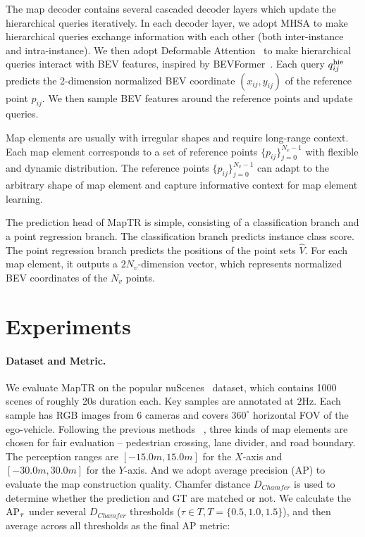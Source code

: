 \documentclass{article} \usepackage{iclr2023_conference,times}
\begin{document}
The map decoder contains several cascaded decoder layers which  update the hierarchical queries iteratively.
In each decoder layer, we adopt MHSA to make hierarchical queries exchange information with each other (both inter-instance and intra-instance).
We then adopt Deformable Attention~\citep{deformdetr} to make hierarchical queries  interact with BEV features, inspired by BEVFormer~\citep{bevformer}. 
Each query $q^{\rm{hie}}_{ij}$ predicts the 2-dimension normalized BEV coordinate $(x_{ij},y_{ij})$ of the reference point $p_{ij}$. We then sample BEV features around the reference points and update queries.

Map elements are usually with irregular shapes and require long-range context. Each map element corresponds to a set of reference points $\{p_{ij}\}_{j=0}^{N_v-1}$ with flexible and dynamic distribution.
The reference points $\{p_{ij}\}_{j=0}^{N_v-1}$ can adapt to the arbitrary shape of map element and capture informative context for map element learning.


The prediction head of MapTR is simple, consisting of  a classification branch and  a point regression branch.
The classification branch predicts instance class score. The point regression branch predicts the positions of the point sets $\hat{V}$. For each map element, it outputs a $2N_v$-dimension vector, which represents normalized BEV coordinates  of the $N_v$ points.




\section{Experiments}


\paragraph{Dataset and Metric.}
We evaluate  MapTR on the popular nuScenes~\citep{nuscenes} dataset, which contains 1000 scenes of roughly 20s duration each. Key samples are annotated at $2$Hz. Each sample has RGB images from $6$ cameras and covers $360^\circ$ horizontal FOV of the ego-vehicle. 
Following the previous methods ~\citep{hdmapnet,vectormapnet}, three kinds of map elements are chosen for fair evaluation -- pedestrian crossing, lane divider, and road boundary. 
The perception ranges are $[-15.0m, 15.0m]$ for the $X$-axis and $[-30.0m, 30.0m]$ for the $Y$-axis. And we adopt average precision (AP) to evaluate the map construction quality.
Chamfer distance $D_{Chamfer}$ is used to determine whether the prediction and GT are matched or not.
We calculate the $\rm{AP}_{\tau}$ under several $D_{Chamfer}$ thresholds ($\tau \in T, T=\{0.5, 1.0, 1.5\}$), and then average across all thresholds as the final AP metric:
\end{document}
